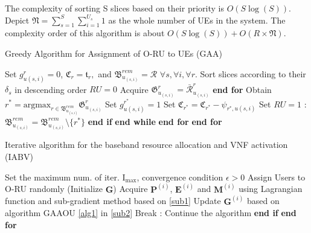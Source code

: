 \documentclass[lettersize,journal]{IEEEtran}
\begin{document}
The complexity of sorting S slices based on their priority is $O(S\log(S))$.
Depict $\mathfrak{N} =  \sum_{s=1}^S\sum_{i=1}^{U_s} 1$ as the whole number of UEs in the system.
The complexity order of this algorithm is about $O(S\log(S)) + O(R\times \mathfrak{N})$.
\begin{algorithm}
\small
\caption{Greedy Algorithm for Assignment of O-RU to UEs (GAA)}\label{alg1}
\begin{algorithmic}[1]
\State Set $g^r_{u(s,i)} = 0$, $\mathfrak{C}_r = \mathfrak{t}_r,$ and ${\mathfrak{B}}^{rem}_{u_{(s,i)}} = \mathcal{R}$   $\forall s, \forall i, \forall r$.\label{31}
\State Sort slices according to their $\delta_s$ in descending order
\label{33}
\State $RU = 0$
\State Acquire $\mathfrak{G}^r_{u_{(s,i)}} = \bar{\mathcal{R}}^r_{u_{(s,i)}}$
\EndFor
\State \textbf{end for}
\State Obtain $r^* = \text{argmax}_{r\in{\mathfrak{B}}^{rem}_{u_{(s,i)}}} \mathfrak{G}^r_{u_{(s,i)}}$
\State Set $g^{r^*}_{u(s,i)} = 1$
\State Set  $\mathfrak{C}_{r^*} = \mathfrak{C}_{r^*} - \psi_{{r^*},u(s,i)}$
\State Set $RU = 1$
\Else: ${\mathfrak{B}}^{rem}_{u_{(s,i)}} = {\mathfrak{B}}^{rem}_{u_{(s,i)}} \setminus \{{r^*}\} $ 
\EndIf
\State \textbf{end if}
\EndWhile
\State \textbf{end while}
\EndFor
\State \textbf{end for}
\EndFor
\State \textbf{end for} \label{34}
\end{algorithmic}
\end{algorithm}

 \begin{algorithm}
 \small
\caption{Iterative algorithm for the baseband resource allocation and VNF activation (IABV)}\label{alg2}
\begin{algorithmic}[1]
\State  Set the maximum num. of iter. ${\text{I}}_{\max}$, convergence condition $\epsilon > 0$ \label{a21}
\State  Assign Users to O-RU randomly (Initialize $\boldsymbol{G}$) \label{a22}
\label{23}
\State Acquire $\boldsymbol{P}^{(i)}$, $\boldsymbol{E}^{(i)}$ and $\boldsymbol{M}^{(i)}$ using Lagrangian function and sub-gradient method based on \eqref{sub1}
\State Update $\boldsymbol{G}^{(i)}$   based on algorithm GAAOU \eqref{alg1} in  \eqref{sub2}
\State Break
\Else:   Continue the algorithm
\EndIf
\State \textbf{end if}
\EndFor
\State \textbf{end for} \label{24}
\end{algorithmic}
\end{algorithm}
\end{document}
